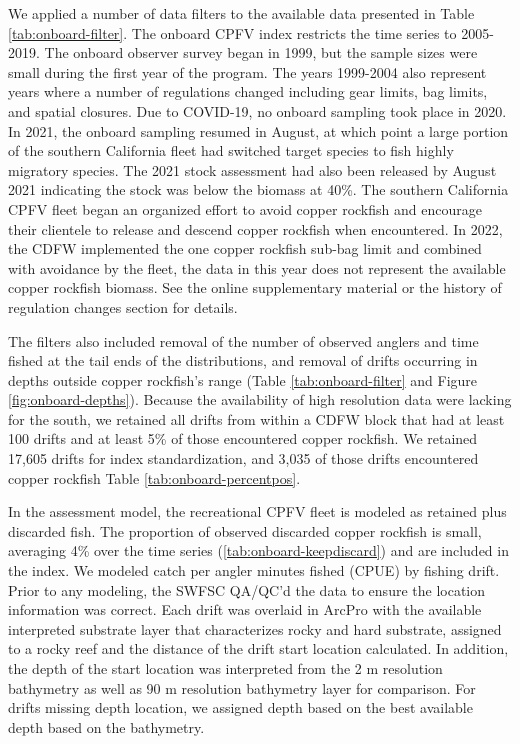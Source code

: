 \documentclass[11pt,
  english,
  letterpaper,
]{article}
\begin{document}
We applied a number of data filters to the available data presented in Table \ref{tab:onboard-filter}. The onboard CPFV index restricts the time series to 2005-2019. The onboard observer survey began in 1999, but the sample sizes were small during the first year of the program. The years 1999-2004 also represent years where a number of regulations changed including gear limits, bag limits, and spatial closures. Due to COVID-19, no onboard sampling took place in 2020. In 2021, the onboard sampling resumed in August, at which point a large portion of the southern California fleet had switched target species to fish highly migratory species. The 2021 stock assessment had also been released by August 2021 indicating the stock was below the biomass at 40\%. The southern California CPFV fleet began an organized effort to avoid copper rockfish and encourage their clientele to release and descend copper rockfish when encountered. In 2022, the CDFW implemented the one copper rockfish sub-bag limit and combined with avoidance by the fleet, the data in this year does not represent the available copper rockfish biomass. See the online supplementary material or the history of regulation changes section for details.

The filters also included removal of the number of observed anglers and time fished at the tail ends of the distributions, and removal of drifts occurring in depths outside copper rockfish's range (Table \ref{tab:onboard-filter} and Figure \ref{fig:onboard-depths}). Because the availability of high resolution data were lacking for the south, we retained all drifts from within a CDFW block that had at least 100 drifts and at least 5\% of those encountered copper rockfish. We retained 17,605 drifts for index standardization, and 3,035 of those drifts encountered copper rockfish Table \ref{tab:onboard-percentpos}.

In the assessment model, the recreational CPFV fleet is modeled as retained plus discarded fish. The proportion of observed discarded copper rockfish is small, averaging 4\% over the time series (\ref{tab:onboard-keepdiscard}) and are included in the index. We modeled catch per angler minutes fished (CPUE) by fishing drift. Prior to any modeling, the SWFSC QA/QC'd the data to ensure the location information was correct. Each drift was overlaid in ArcPro with the available interpreted substrate layer that characterizes rocky and hard substrate, assigned to a rocky reef and the distance of the drift start location calculated. In addition, the depth of the start location was interpreted from the 2 m resolution bathymetry as well as 90 m resolution bathymetry layer for comparison. For drifts missing depth location, we assigned depth based on the best available depth based on the bathymetry.
\end{document}
